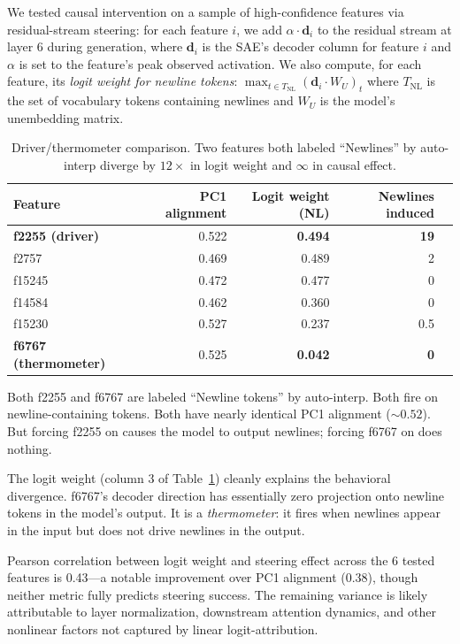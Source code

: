 \documentclass[11pt]{article}
\begin{document}
We tested causal intervention on a sample of high-confidence features via
residual-stream steering: for each feature $i$, we add $\alpha \cdot \mathbf{d}_i$
to the residual stream at layer 6 during generation, where $\mathbf{d}_i$ is the
SAE's decoder column for feature $i$ and $\alpha$ is set to the feature's peak
observed activation. We also compute, for each feature, its \emph{logit weight
for newline tokens}: $\max_{t \in T_{\text{NL}}} (\mathbf{d}_i \cdot W_U)_t$
where $T_{\text{NL}}$ is the set of vocabulary tokens containing newlines and
$W_U$ is the model's unembedding matrix.

\begin{table}[h]
\centering
\caption{Driver/thermometer comparison. Two features both labeled ``Newlines'' by
auto-interp diverge by $12\times$ in logit weight and $\infty$ in causal effect.}
\label{tab:drivertherm}
\begin{tabular}{lrrrr}
\toprule
Feature & PC1 alignment & Logit weight (NL) & Newlines induced \\
\midrule
\textbf{f2255 (driver)} & 0.522 & \textbf{0.494} & \textbf{19} \\
f2757 & 0.469 & 0.489 & 2 \\
f15245 & 0.472 & 0.477 & 0 \\
f14584 & 0.462 & 0.360 & 0 \\
f15230 & 0.527 & 0.237 & 0.5 \\
\textbf{f6767 (thermometer)} & 0.525 & \textbf{0.042} & \textbf{0} \\
\bottomrule
\end{tabular}
\end{table}

Both f2255 and f6767 are labeled ``Newline tokens'' by auto-interp. Both fire on
newline-containing tokens. Both have nearly identical PC1 alignment ($\sim 0.52$).
But forcing f2255 on causes the model to output newlines; forcing f6767 on does
nothing.

The logit weight (column 3 of Table~\ref{tab:drivertherm}) cleanly explains the
behavioral divergence. f6767's decoder direction has essentially zero projection
onto newline tokens in the model's output. It is a \emph{thermometer}: it fires
when newlines appear in the input but does not drive newlines in the output.

Pearson correlation between logit weight and steering effect across the 6 tested
features is 0.43---a notable improvement over PC1 alignment (0.38), though
neither metric fully predicts steering success. The remaining variance is likely
attributable to layer normalization, downstream attention dynamics, and other
nonlinear factors not captured by linear logit-attribution.
\end{document}
